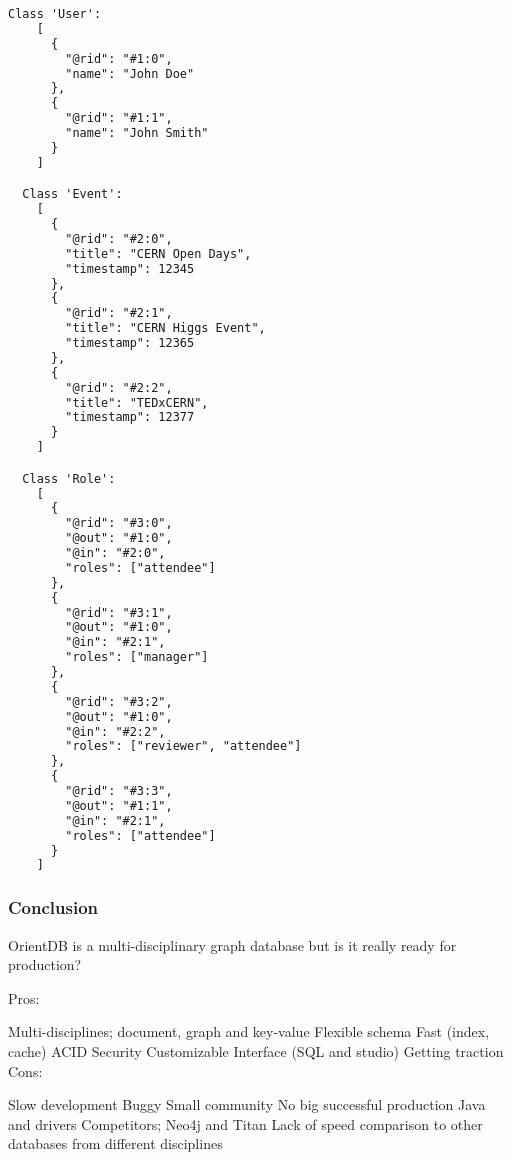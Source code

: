 \begin{lstlisting}[language=HTML]
  Class 'User':
    [
      {
        "@rid": "#1:0",
        "name": "John Doe"
      },
      {
        "@rid": "#1:1",
        "name": "John Smith"
      }
    ]

  Class 'Event':
    [
      {
        "@rid": "#2:0",
        "title": "CERN Open Days",
        "timestamp": 12345
      },
      {
        "@rid": "#2:1",
        "title": "CERN Higgs Event",
        "timestamp": 12365
      },
      {
        "@rid": "#2:2",
        "title": "TEDxCERN",
        "timestamp": 12377
      }
    ]

  Class 'Role':
    [
      {
        "@rid": "#3:0",
        "@out": "#1:0",
        "@in": "#2:0",
        "roles": ["attendee"]
      },
      {
        "@rid": "#3:1",
        "@out": "#1:0",
        "@in": "#2:1",
        "roles": ["manager"]
      },
      {
        "@rid": "#3:2",
        "@out": "#1:0",
        "@in": "#2:2",
        "roles": ["reviewer", "attendee"]
      },
      {
        "@rid": "#3:3",
        "@out": "#1:1",
        "@in": "#2:1",
        "roles": ["attendee"]
      }
    ]

\end{lstlisting}

\subsubsection*{Conclusion}

OrientDB is a multi-disciplinary graph database but is it really ready for production?

Pros:

Multi-disciplines; document, graph and key-value
Flexible schema
Fast (index, cache)
ACID
Security
Customizable
Interface (SQL and studio)
Getting traction
Cons:

Slow development
Buggy
Small community
No big successful production
Java and drivers
Competitors; Neo4j and Titan
Lack of speed comparison to other databases from different disciplines